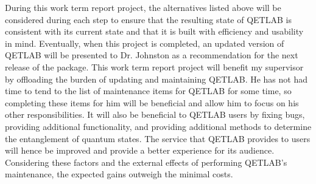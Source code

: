 \documentclass[12pt]{article}
\begin{document}
During this work term report project, the alternatives listed above will be considered during each step to ensure that the resulting state of QETLAB is consistent with its current state and that it is built with efficiency and usability in mind. Eventually, when this project is completed, an updated version of QETLAB will be presented to Dr. Johnston as a recommendation for the next release of the package. This work term report project will benefit my supervisor by offloading the burden of updating and maintaining QETLAB. He has not had time to tend to the list of maintenance items for QETLAB for some time, so completing these items for him will be beneficial and allow him to focus on his other responsibilities. It will also be beneficial to QETLAB users by fixing bugs, providing additional functionality, and providing additional methods to determine the entanglement of quantum states. The service that QETLAB provides to users will hence be improved and provide a better experience for its audience. Considering these factors and the external effects of performing QETLAB's maintenance, the expected gains outweigh the minimal costs.
\end{document}
